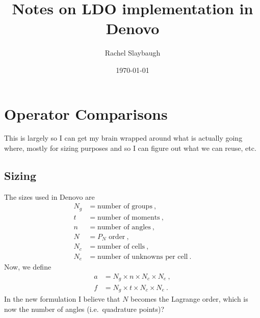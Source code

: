 \documentclass[12pt,twoside]{article}
\date{\today}
\title{Notes on LDO implementation in Denovo}
\author{Rachel Slaybaugh}
\begin{document}
\maketitle

\section*{Operator Comparisons}
This is largely so I can get my brain wrapped around what is actually going where, mostly for sizing purposes and so I can figure out what we can reuse, etc.

\subsection*{Sizing}
The sizes used in Denovo are
\begin{equation}
  \begin{aligned}
    N_g &= \text{number of groups}\:,\\
    t   &= \text{number of moments}\:,\\
    n   &= \text{number of angles}\:,\\
    N   &= \text{$P_N$ order}\:,\\
    N_c &= \text{number of cells}\:,\\
    N_e &= \text{number of unknowns per cell}\:.
  \end{aligned}
\end{equation}
Now, we define
\begin{align}
  a &= N_g\times n\times N_c\times N_e\:,\\
  f &= N_g\times t\times N_c\times N_e\:.
\end{align}
In the new formulation I believe that $N$ becomes the Lagrange order, which is now the number of angles (i.e.\ quadrature points)?

\end{document}
